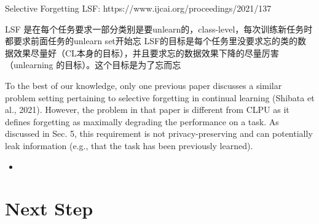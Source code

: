 \documentclass[
  ignorenonframetext,
  aspectratio=169,
]{beamer}
\providecommand{\tightlist}{%
  \setlength{\itemsep}{0pt}\setlength{\parskip}{0pt}}\usepackage{longtable,booktabs,array}
\begin{document}
\begin{frame}{Selective Forgetting}
\label{selective-forgetting}
LSF: https://www.ijcai.org/proceedings/2021/137

LSF
是在每个任务要求一部分类别是要unlearn的，class-level，每次训练新任务时都要求前面任务的unlearn
set开始忘
LSF的目标是每个任务里没要求忘的类的数据效果尽量好（CL本身的目标），并且要求忘的数据效果下降的尽量厉害（unlearning
的目标）。这个目标是为了忘而忘

To the best of our knowledge, only one previous paper discusses a
similar problem setting pertaining to selective forgetting in continual
learning (Shibata et al., 2021). However, the problem in that paper is
different from CLPU as it defines forgetting as maximally degrading the
performance on a task. As discussed in Sec. 5, this requirement is not
privacy-preserving and can potentially leak information (e.g., that the
task has been previously learned).

\begin{itemize}
\tightlist
\item
\end{itemize}
\end{frame}

\section{Next Step}\label{next-step}
\end{document}
